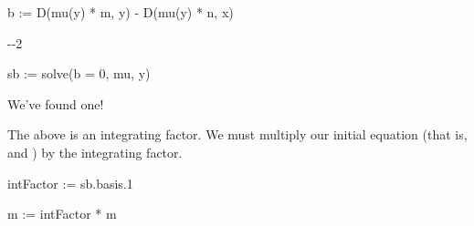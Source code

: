 {{{{{{{{{{{{{{{{\begin{xtc}
\begin{spadsrc}
b := D(mu(y) * m, y) - D(mu(y) * n, x) 
\end{spadsrc}
\begin{TeXOutput}
\begin{fricasmath}{7}
-{\TIMES {}}-{2%
\TIMES {}}%
\end{fricasmath}
\end{TeXOutput}
\end{xtc}
\begin{xtc}
\begin{xtccomment}
\end{xtccomment}
\begin{spadsrc}
sb := solve(b = 0, mu, y) 
\end{spadsrc}
\begin{TeXOutput}
\begin{fricasmath}{8}
%
\end{fricasmath}
\end{TeXOutput}
\end{xtc}
\noindent
We've found one!
%
\begin{xtc}
\begin{xtccomment}
The above  is an integrating factor.
We must multiply our initial equation
(that is,  and ) by the integrating factor.
\end{xtccomment}
\begin{spadsrc}
intFactor := sb.basis.1 
\end{spadsrc}
\begin{TeXOutput}
\begin{fricasmath}{9}
%
\end{fricasmath}
\end{TeXOutput}
\end{xtc}
\begin{xtc}
\begin{xtccomment}
\end{xtccomment}
\begin{spadsrc}
m := intFactor * m 
\end{spadsrc}
\begin{TeXOutput}
\begin{fricasmath}{10}

\end{fricasmath}
\end{TeXOutput}
\end{xtc}}}}}}}}}}}}}}}}}
